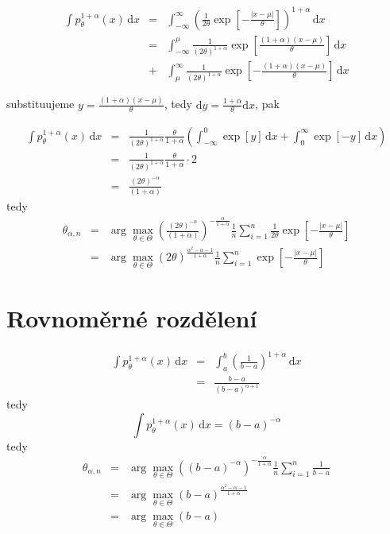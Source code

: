 \documentclass[11pt]{article}
\newcommand{\intpa}{\int p_\theta^{1+\alpha}(x) \, \mathrm{d}x }
\newcommand{\amtiT}{\arg \max_{\theta \in \Theta}}
\begin{document}
\begin{eqnarray}
\intpa & = & \int_{-\infty }^{\infty } \left( {\frac{1}{2\theta} \exp{ \left[ -\frac{|x -\mu |}{\theta } \right] }} \right) ^{1 + \alpha} \, \mathrm{d}x \nonumber\\
 & = & \int_{-\infty }^{\mu } {\frac{1}{ (2\theta)^{ 1 + \alpha}} \exp{ \left[ \frac{(1 + \alpha )(x -\mu )}{\theta } \right] }} \, \mathrm{d}x \nonumber\\
 & + & \int_{\mu }^{\infty } {\frac{1}{ (2\theta)^{ 1 + \alpha}} \exp{ \left[ -\frac{(1 + \alpha )(x -\mu )}{\theta } \right] }} \, \mathrm{d}x \nonumber
\end{eqnarray} 

substituujeme $ y = \frac{(1+\alpha)(x-\mu)}{\theta} $, tedy $\mathrm{d}y = \frac{1+\alpha}{\theta}\mathrm{d}x $, pak

\begin{eqnarray}
\intpa & = & \frac{1}{ (2\theta)^{ 1 + \alpha}} \frac{\theta}{1+\alpha} \left( 
\int_{-\infty }^{0 } {\exp{ \left[ y \right] }} \, \mathrm{d}x + 
\int_{0 }^{\infty } {\exp{ \left[ -y \right] }} \, \mathrm{d}x \right) \nonumber\\
& = & \frac{1}{ (2\theta)^{ 1 + \alpha}} \frac{\theta}{1+\alpha} \cdot 2  \nonumber\\
& = & \frac{(2\theta)^{-\alpha}}{(1+\alpha)} 
\end{eqnarray}
tedy 
\begin{eqnarray}
	\theta_{\alpha,n} &= &\amtiT \left( \frac{(2\theta)^{-\alpha}}{(1+\alpha)}  \right)^{-\frac{\alpha}{1+\alpha}} \frac{1}{n} \sum_{i=1}^n \frac{1}{2\theta} \exp \left[-\frac{|x-\mu|}{\theta} \right] \nonumber\\
	&=& \amtiT (2\theta)^\frac{\alpha^2 - \alpha - 1}{1+\alpha} \frac{1}{n} \sum_{i=1}^n \exp \left[-\frac{|x-\mu|}{\theta} \right]
\end{eqnarray}


\section{Rovnoměrné rozdělení}

\begin{eqnarray}
\intpa & = & \int_{a }^{b } \left( \frac{1}{b-a} \right) ^{1 + \alpha} \, \mathrm{d}x \nonumber\\
& = & \frac{b-a}{(b-a)^{\alpha+1}} \nonumber
\end{eqnarray} 
tedy
\begin{equation}
\intpa = (b-a)^{-\alpha}
\end{equation}
tedy 
\begin{eqnarray}
	\theta_{\alpha,n} & = & \amtiT \left( (b-a)^{-\alpha} \right)^{-\frac{\alpha}{1+\alpha}} \frac{1}{n} \sum_{i=1}^n \frac{1}{b-a} \nonumber\\
	& = & \amtiT (b-a)^{\frac{\alpha^2 - \alpha - 1}{1+\alpha}}	\nonumber\\
	& = & \amtiT  (b-a)
\end{eqnarray}
\end{document}
